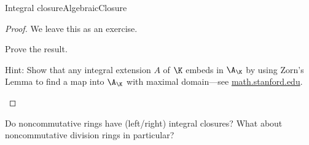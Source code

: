 \begin{thm}{Integral closure}{AlgebraicClosure}
\begin{proof}
		We leave this as an exercise.
		\begin{exr}[breakable=false]{}{}
			Prove the result.
			\begin{rmk}
				Hint:  Show that any integral extension $A$ of $\K$ embeds in $\A _{\K}$ by using Zorn's Lemma to find a map into $\A _{\K}$ with maximal domain---see \href{http://math.stanford.edu/~conrad/121Page/handouts/algclosure.pdf}{math.stanford.edu}.
			\end{rmk}
		\end{exr}
	\end{proof}
\end{thm}
\begin{exr}{}{}
	Do noncommutative rings have (left/right) integral closures?  What about noncommutative division rings in particular?  
\end{exr}

